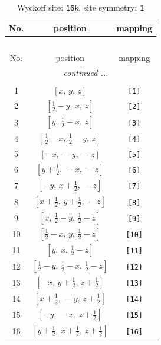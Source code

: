 \documentclass[fleqn,8pt]{jsarticle}
\begin{document}
\begin{longtable}{ccc}
\caption{Wyckoff site: {\tt 16k}, site symmetry: {\tt 1}}
 \\
 \hline \hline
No. & position & mapping \\ \hline \endfirsthead

\multicolumn{2}{l}{\tablename\ \thetable{}} \\
 \hline \hline
No. & position & mapping \\ \hline \endhead

 \hline \hline
\multicolumn{2}{r}{\footnotesize\it continued ...} \\ \endfoot

 \hline \hline
\multicolumn{2}{r}{} \\ \endlastfoot

1 & $\left[ x,\, y,\, z \right]$ & {\tt [1]} \\ \hline
2 & $\left[ \frac{1}{2} - y,\, x,\, z \right]$ & {\tt [2]} \\ \hline
3 & $\left[ y,\, \frac{1}{2} - x,\, z \right]$ & {\tt [3]} \\ \hline
4 & $\left[ \frac{1}{2} - x,\, \frac{1}{2} - y,\, z \right]$ & {\tt [4]} \\ \hline
5 & $\left[ - x,\, - y,\, - z \right]$ & {\tt [5]} \\ \hline
6 & $\left[ y + \frac{1}{2},\, - x,\, - z \right]$ & {\tt [6]} \\ \hline
7 & $\left[ - y,\, x + \frac{1}{2},\, - z \right]$ & {\tt [7]} \\ \hline
8 & $\left[ x + \frac{1}{2},\, y + \frac{1}{2},\, - z \right]$ & {\tt [8]} \\ \hline
9 & $\left[ x,\, \frac{1}{2} - y,\, \frac{1}{2} - z \right]$ & {\tt [9]} \\ \hline
10 & $\left[ \frac{1}{2} - x,\, y,\, \frac{1}{2} - z \right]$ & {\tt [10]} \\ \hline
11 & $\left[ y,\, x,\, \frac{1}{2} - z \right]$ & {\tt [11]} \\ \hline
12 & $\left[ \frac{1}{2} - y,\, \frac{1}{2} - x,\, \frac{1}{2} - z \right]$ & {\tt [12]} \\ \hline
13 & $\left[ - x,\, y + \frac{1}{2},\, z + \frac{1}{2} \right]$ & {\tt [13]} \\ \hline
14 & $\left[ x + \frac{1}{2},\, - y,\, z + \frac{1}{2} \right]$ & {\tt [14]} \\ \hline
15 & $\left[ - y,\, - x,\, z + \frac{1}{2} \right]$ & {\tt [15]} \\ \hline
16 & $\left[ y + \frac{1}{2},\, x + \frac{1}{2},\, z + \frac{1}{2} \right]$ & {\tt [16]} \\
\end{longtable}
\end{document}
